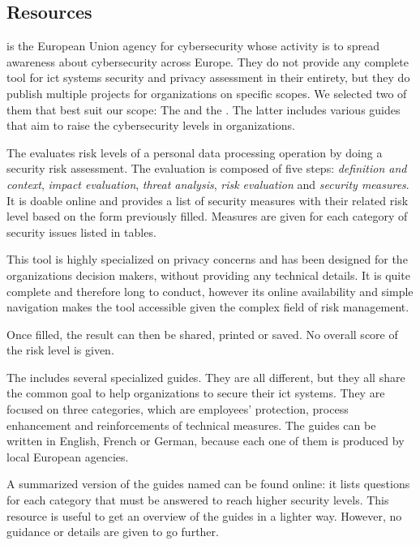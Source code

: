 \subsection{ Resources}

 is the European Union agency for cybersecurity whose activity is to spread awareness about cybersecurity across Europe. They do not provide any complete tool for \gls{ict} systems security and privacy assessment in their entirety, but they do publish multiple projects for organizations on specific scopes. We selected two of them that best suit our scope: The  and the . The latter includes various guides that aim to raise the cybersecurity levels in organizations.

The  evaluates risk levels of a personal data processing operation by doing a security risk assessment. The evaluation is composed of five steps: \textit{definition and context}, \textit{impact evaluation}, \textit{threat analysis}, \textit{risk evaluation} and \textit{security measures}. It is doable online and provides a list of security measures with their related risk level based on the form previously filled. Measures are given for each category of security issues listed in tables.

This tool is highly specialized on privacy concerns and has been designed for the organizations decision makers, without providing any technical details. It is quite complete and therefore long to conduct, however its online availability and simple navigation makes the tool accessible given the complex field of risk management.

Once filled, the result can then be shared, printed or saved. No overall score of the risk level is given.

The  includes several specialized guides. They are all different, but they all share the common goal to help organizations to secure their \gls{ict} systems. They are focused on three categories, which are employees' protection, process enhancement and reinforcements of technical measures. The guides can be written in English, French or German, because each one of them is produced by local European agencies.

A summarized version of the guides named  can be found online: it lists questions for each category that must be answered to reach higher security levels. This resource is useful to get an overview of the  guides in a lighter way. However, no guidance or details are given to go further.

